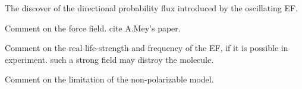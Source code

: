 \documentclass[a4paper,preprint,unsortedaddress,onecolumn]{revtex4-1}
\begin{document}
The discover of the directional probability flux introduced by the
oscillating EF.

Comment on the force field. cite A.Mey's paper.

Comment on the real life-strength and frequency of the EF, if it is
possible in experiment. such a strong field may distroy the molecule.

Comment on the limitation of the non-polarizable model. 




\end{document}
